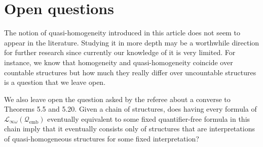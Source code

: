 \documentclass{ndjflart}
\DeclareMathOperator{\emb}{emb}
\begin{document}
\section{Open questions}
The notion of quasi-homogeneity introduced in this article does not seem to
appear in the literature.
Studying it in more depth may be a worthwhile direction for further
research since currently our knowledge of it is very limited.
For instance, we know that homogeneity and quasi-homogeneity coincide over
countable structures
but how much they really differ over uncountable structures is a question
that we leave open.

We also leave open the question asked by the referee about a
converse to Theorems 5.5 and 5.20.
Given a chain of structures, does having every formula of
$\mathcal{L}_{\infty \omega}(\mathcal{Q}_{\emb})$
eventually equivalent to some fixed quantifier-free formula in this chain
imply that it eventually consists only of structures that are interpretations
of quasi-homogeneous structures for some fixed interpretation?
\end{document}
